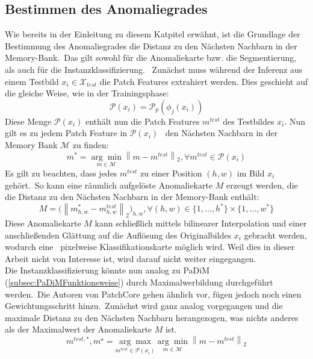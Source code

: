 \subsection{Bestimmen des Anomaliegrades}\label{subsec:BestimmenDesAnomaliegradesPatchcore}
Wie bereits in der Einleitung zu diesem Katpitel erwähnt, ist die Grundlage der Bestimmung des Anomaliegrades die Distanz zu den Nächsten Nachbarn in der Memory-Bank.\ 
Das gilt sowohl für die Anomaliekarte bzw. die Segmentierung, als auch für die Instanzklassifizierung. \
Zunächst muss während der Inferenz aus einem Testbild $x_{i}\in\mathcal{X}_{test}$ die Patch Features extrahiert werden. Dies geschieht auf die gleiche Weise, wie in der Trainingsphase:\
$$
\mathcal{P}\left(x_{i}\right)= \mathcal{P}_{p}\left(\phi_{j}\left(x_{i}\right)\right)
$$
Diese Menge $\mathcal{P}\left(x_{i}\right)$ enthält nun die Patch Features $m^{test}$ des Testbildes $x_{i}$. Nun gilt es zu jedem Patch Feature in $\mathcal{P}\left(x_{i}\right)$ \
den Nächsten Nachbarn in der Memory Bank $\mathcal{M}$ zu finden:\
$$
m^{*} = \underset{m\in\mathcal{M}}{\arg\min}\left\|m-m^{test}\right\|_{2}, \forall m^{test}\in\mathcal{P}\left(x_{i}\right)
$$
Es gilt zu beachten, dass jedes $m^{test}$ zu einer Position $(h,w)$ im Bild $x_{i}$ gehört.\
So kann eine räumlich aufgelöste Anomaliekarte $M$ erzeugt werden, die die Distanz zu den Nächsten Nachbarn in der Memory-Bank enthält:
$$
M = \Big(\left\|m^{*}_{h,w}-m^{test}_{h,w}\right\|_{2}\Big)_{h,w},\forall \left(h,w\right)\in\{1,...,h^{*}\}\times\{1,...,w^{*}\} %
$$
Diese Anomaliekarte $M$ kann schließlich mittels bilinearer Interpolation und einer anschließenden Glättung auf die Auflösung des Originalbildes $x_{i}$ gebracht werden, wodurch eine \
pixelweise Klassifikationskarte möglich wird. Weil dies in dieser Arbeit nicht von Interesse ist, wird darauf nicht weiter eingegangen.\\
Die Instanzklassifizierung könnte nun analog zu PaDiM (\ref{subsec:PaDiMFunktionsweise}) durch Maximalwerbildung durchgeführt werden.\
Die Autoren von PatchCore gehen ähnlich vor, fügen jedoch noch einen Gewichtungsschritt hinzu.\
Zunächst wird ganz analog vorgegangen und die maximale Distanz zu den Nächsten Nachbarn herangezogen, was nichts anderes als der Maximalwert der Anomaliekarte $M$ ist.\
$$
m^{test,*}, m^{\star}=\underset{m^{test}\in\mathcal{P}(x_{i})}{\arg\max}\underset{m\in\mathcal{M}}{\arg\min}\left\|m-m^{test}\right\|_{2}
$$

